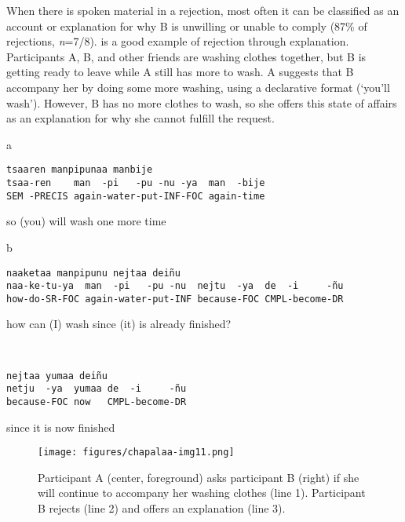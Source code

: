 \documentclass[output=paper]{langsci/langscibook}
\begin{document}
When there is spoken material in a rejection, most often it can be classified as an account or explanation for why B is unwilling or unable to comply (87\% of rejections, \textit{n}=7/8).  is a good example of rejection through explanation. Participants A, B, and other friends are washing clothes together, but B is getting ready to leave while A still has more to wash. A suggests that B accompany her by doing some more washing, using a declarative format (‘you'll wash’). However, B has no more clothes to wash, so she offers this state of affairs as an explanation for why she cannot fulfill the request.

\vspace{-1mm}
%
\begin{mdframednoverticalspace}[style=firstfoc]
\begin{transbox}{1}{a}
\begin{verbatim}
tsaaren manpipunaa manbije
tsaa-ren    man  -pi   -pu -nu -ya  man  -bije
SEM -PRECIS again-water-put-INF-FOC again-time
\end{verbatim}
so (you) will wash one more time
\end{transbox}
\end{mdframednoverticalspace}
%
\begin{mdframednoverticalspace}[style=secondfoc]
\begin{transbox}{2}{b}
\begin{verbatim}
naaketaa manpipunu nejtaa deiñu
naa-ke-tu-ya  man  -pi   -pu -nu  nejtu  -ya  de  -i     -ñu
how-do-SR-FOC again-water-put-INF because-FOC CMPL-become-DR
\end{verbatim}
 how can (I) wash since (it) is already finished?
\end{transbox}
\end{mdframednoverticalspace}
%
\begin{mdframednoverticalspace}[style=secondfoc]
\begin{transbox}{3}{~}
\begin{verbatim}
nejtaa yumaa deiñu
netju  -ya  yumaa de  -i     -ñu
because-FOC now   CMPL-become-DR
\end{verbatim}
since it is now finished
\end{transbox}
\end{mdframednoverticalspace}\bigskip

\begin{figure}
\caption{Participant A (center, foreground) asks participant B (right) if she will continue to accompany her washing clothes (line 1). Participant B rejects (line 2) and offers an explanation (line 3). }
\label{fig:floyd:9}
\texttt{[image: figures/chapalaa-img11.png]}
\end{figure}
\end{document}
